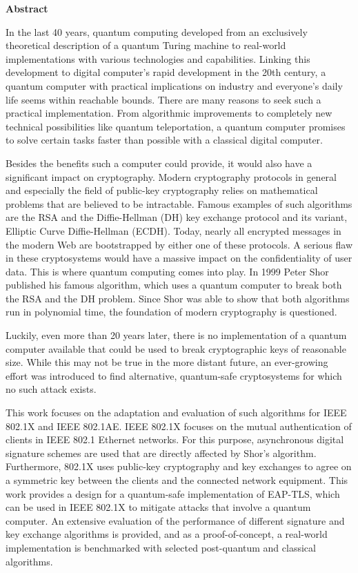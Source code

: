 \vspace*{2cm}

\begin{center}
    \textbf{Abstract}
\end{center}

\vspace*{1cm}

\noindent In the last 40 years, quantum computing developed from an exclusively theoretical description of a quantum Turing machine to real-world implementations with various technologies and capabilities. Linking this development to digital computer's rapid development in the 20th century, a quantum computer with practical implications on industry and everyone's daily life seems within reachable bounds. There are many reasons to seek such a practical implementation. From algorithmic improvements to completely new technical possibilities like quantum teleportation, a quantum computer promises to solve certain tasks faster than possible with a classical digital computer.

\par Besides the benefits such a computer could provide, it would also have a significant impact on cryptography. Modern cryptography protocols in general and especially the field of public-key cryptography relies on mathematical problems that are believed to be intractable. Famous examples of such algorithms are the RSA and the Diffie-Hellman (DH) key exchange protocol and its variant, Elliptic Curve Diffie-Hellman (ECDH). Today, nearly all encrypted messages in the modern Web are bootstrapped by either one of these protocols. A serious flaw in these cryptosystems would have a massive impact on the confidentiality of user data. This is where quantum computing comes into play. In 1999 Peter Shor published his famous algorithm, which uses a quantum computer to break both the RSA and the DH problem. Since Shor was able to show that both algorithms run in polynomial time, the foundation of modern cryptography is questioned.

Luckily, even more than 20 years later, there is no implementation of a quantum computer available that could be used to break cryptographic keys of reasonable size. While this may not be true in the more distant future, an ever-growing effort was introduced to find alternative, quantum-safe cryptosystems for which no such attack exists.

This work focuses on the adaptation and evaluation of such algorithms for IEEE 802.1X and IEEE 802.1AE. IEEE 802.1X focuses on the mutual authentication of clients in IEEE 802.1 Ethernet networks. For this purpose, asynchronous digital signature schemes are used that are directly affected by Shor's algorithm. Furthermore, 802.1X uses public-key cryptography and key exchanges to agree on a symmetric key between the clients and the connected network equipment. This work provides a design for a quantum-safe implementation of EAP-TLS, which can be used in IEEE 802.1X to mitigate attacks that involve a quantum computer. An extensive evaluation of the performance of different signature and key exchange algorithms is provided, and as a proof-of-concept, a real-world implementation is benchmarked with selected post-quantum and classical algorithms.